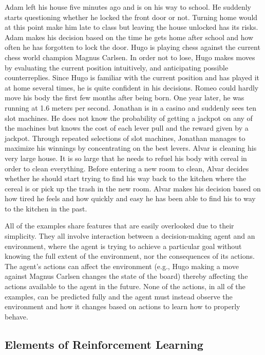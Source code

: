 \documentclass[titlepage]{article}
\begin{document}
\begin{outline}
    \1 Adam left his house five minutes ago and is on his way to school. He suddenly starts questioning whether he locked the front door or not. Turning home would at this point make him late to class but leaving the house unlocked has its risks. Adam makes his decision based on the time he gets home after school and how often he has forgotten to lock the door. 
    \1 Hugo is playing chess against the current chess world champion Magnus Carlsen. In order not to lose, Hugo makes moves by evaluating the current position intuitively, and anticipating possible counterreplies. Since Hugo is familiar with the current position and has played it at home several times, he is quite confident in his decisions. 
    \1 Romeo could hardly move his body the first few months after being born. One year later, he was running at 1.6 meters per second.
    \1 Jonathan is in a casino and suddenly sees ten slot machines. He does not know the probability of getting a jackpot on any of the machines but knows the cost of each lever pull and the reward given by a jackpot. Through repeated selections of slot machines, Jonathan manages to maximize his winnings by concentrating on the best levers. 
    \1 Alvar is cleaning his very large house. It is so large that he needs to refuel his body with cereal in order to clean everything. Before entering a new room to clean, Alvar decides whether he should start trying to find his way back to the kitchen where the cereal is or pick up the trash in the new room. Alvar makes his decision based on how tired he feels and how quickly and easy he has been able to find his to way to the kitchen in the past.
\end{outline}

\vskip 0.2cm

\noindent
All of the examples share features that are easily overlooked due to their simplicity. They all involve interaction between a decision-making agent and an environment, where the agent is trying to achieve a particular goal without knowing the full extent of the environment, nor the consequences of its actions. The agent's actions can affect the environment (e.g., Hugo making a move against Magnus Carlsen changes the state of the board) thereby affecting the actions available to the agent in the future. None of the actions, in all of the examples, can be predicted fully and the agent must instead observe the environment and how it changes based on actions to learn how to properly behave. 

\subsection{Elements of Reinforcement Learning}
\end{document}
